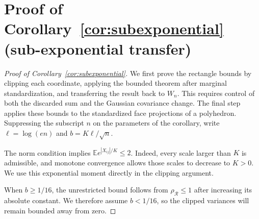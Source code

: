 \documentclass[11pt,letterpaper]{article}
\theoremstyle{remark}
\newcommand{\E}{\mathbb E}
\newcommand{\rh}{\rho_{\mathcal R}}
\begin{document}
\section{Proof of Corollary~\ref*{cor:subexponential} (sub-exponential transfer)}\label{app:subexponential}
\begin{proof}[Proof of Corollary~\ref{cor:subexponential}]
We first prove the rectangle bounds by clipping each coordinate,
applying the bounded theorem after marginal standardization, and
transferring the result back to \(W_n\). This requires control of both
the discarded sum and the Gaussian covariance change. The final step
applies these bounds to the standardized face projections of a polyhedron.
Suppressing the subscript \(n\) on the parameters of the corollary,
write \(\ell=\log(en)\) and \(b=K\ell/\sqrt n\).

The norm condition implies \(\E e^{|X_{ij}|/K}\le2\). Indeed,
every scale larger than \(K\) is admissible, and monotone convergence
allows those scales to decrease to \(K>0\). We use this exponential
moment directly in the clipping argument.

When \(b\ge1/16\), the unrestricted bound follows from
\(\rh\le1\) after increasing its absolute constant. We therefore
assume \(b<1/16\), so the clipped variances will remain bounded
away from zero.


\end{proof}
\end{document}
